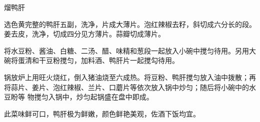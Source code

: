 %
%
%
%
%
%
%
\begin{recipe}{熘鸭肝}

\ingredients


\preparation

\step 选色黄完整的鸭肝五副，洗净，片成大薄片。泡红辣椒去籽，斜切成六分长的段。
姜去皮，洗净，切成四分见方薄片。蒜瓣切成薄片。

\step 将水豆粉、酱油、白糖、二汤、醋、味精和葱段一起放入小碗中搅匀待用。另用大
碗将蛋清和干豆粉搅匀，加料酒、鸭肝片一起搅勾待用。

\step 锅放炉上用旺火烧红，倒入猪油烧至六成热。将豆粉、鸭肝搅匀放入油中拨散；再
将蒜片、姜片、泡红辣椒、兰片、口蘑片等依次放入锅中炒匀；随后将小碗中的水豆盼等
物搅匀入锅中，炒匀起锅盛在盘中即成。

\features

此菜味鲜可口，鸭肝极为鲜嫩，颜色鲜艳美观，佐酒下饭均宜。

\end{recipe}

